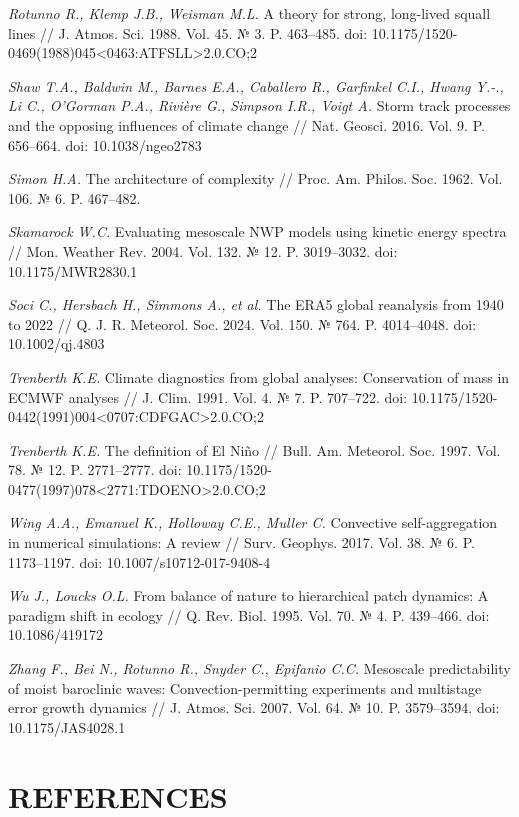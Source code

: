 \documentclass[12pt,a4paper]{article}
\begin{document}
\noindent \textit{Rotunno R., Klemp J.B., Weisman M.L.} A theory for strong, long-lived squall lines // J. Atmos. Sci. 1988. Vol. 45. № 3. P. 463–485. doi: 10.1175/1520-0469(1988)045<0463:ATFSLL>2.0.CO;2

\noindent \textit{Shaw T.A., Baldwin M., Barnes E.A., Caballero R., Garfinkel C.I., Hwang Y.-., Li C., O'Gorman P.A., Rivi\`ere G., Simpson I.R., Voigt A.} Storm track processes and the opposing influences of climate change // Nat. Geosci. 2016. Vol. 9. P. 656–664. doi: 10.1038/ngeo2783

\noindent \textit{Simon H.A.} The architecture of complexity // Proc. Am. Philos. Soc. 1962. Vol. 106. № 6. P. 467–482.

\noindent \textit{Skamarock W.C.} Evaluating mesoscale NWP models using kinetic energy spectra // Mon. Weather Rev. 2004. Vol. 132. № 12. P. 3019–3032. doi: 10.1175/MWR2830.1

\noindent \textit{Soci C., Hersbach H., Simmons A., et al.} The ERA5 global reanalysis from 1940 to 2022 // Q. J. R. Meteorol. Soc. 2024. Vol. 150. № 764. P. 4014–4048. doi: 10.1002/qj.4803

\noindent \textit{Trenberth K.E.} Climate diagnostics from global analyses: Conservation of mass in ECMWF analyses // J. Clim. 1991. Vol. 4. № 7. P. 707–722. doi: 10.1175/1520-0442(1991)004<0707:CDFGAC>2.0.CO;2

\noindent \textit{Trenberth K.E.} The definition of El Niño // Bull. Am. Meteorol. Soc. 1997. Vol. 78. № 12. P. 2771–2777. doi: 10.1175/1520-0477(1997)078<2771:TDOENO>2.0.CO;2

\noindent \textit{Wing A.A., Emanuel K., Holloway C.E., Muller C.} Convective self-aggregation in numerical simulations: A review // Surv. Geophys. 2017. Vol. 38. № 6. P. 1173–1197. doi: 10.1007/s10712-017-9408-4

\noindent \textit{Wu J., Loucks O.L.} From balance of nature to hierarchical patch dynamics: A paradigm shift in ecology // Q. Rev. Biol. 1995. Vol. 70. № 4. P. 439–466. doi: 10.1086/419172

\noindent \textit{Zhang F., Bei N., Rotunno R., Snyder C., Epifanio C.C.} Mesoscale predictability of moist baroclinic waves: Convection-permitting experiments and multistage error growth dynamics // J. Atmos. Sci. 2007. Vol. 64. № 10. P. 3579–3594. doi: 10.1175/JAS4028.1

\clearpage
\section{REFERENCES}
\end{document}
